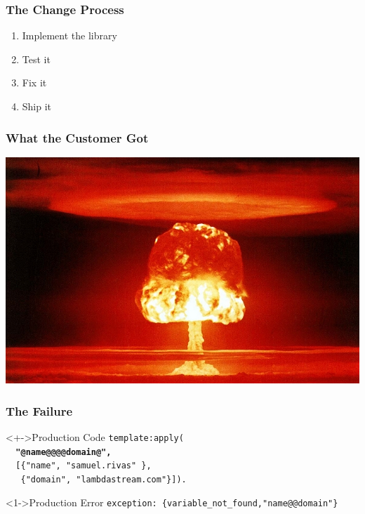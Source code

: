 \documentclass[xcolor=dvipsnames]{beamer}
\begin{document}
\begin{frame}
  \frametitle{The Change Process}
  \begin{enumerate}
  \item Implement the library
  \item Test it
  \item Fix it
  \item Ship it
  \end{enumerate}
\end{frame}

\begin{frame}
  \frametitle{What the Customer Got}
  \includegraphics[width=\textwidth]{images/nuclear}
\end{frame}

\begin{frame}[fragile]
  \frametitle{The Failure}

\begin{block}<+->{Production Code}
\texttt{template:apply(}\\
\vspace{0.25cm}
\texttt{~~\textbf{"\alert<3>{\alert<2>{@name@}@@\alert<2>{@domain@}}",}}\\
\vspace{0.25cm}
\texttt{~~[\{"\alert<2>{name}",   "samuel.rivas"    \},}\\
\texttt{~~~\{"\alert<2>{domain}", "lambdastream.com"\}]).}
\end{block}

\begin{alertblock}<1->{Production Error}
\texttt{exception: \{variable\_not\_found,"\alert<3>{name@@domain}"\}}
\end{alertblock}
\end{frame}
\end{document}
